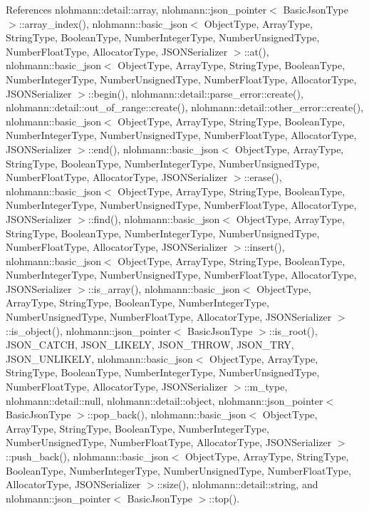 References nlohmann\+::detail\+::array, nlohmann\+::json\+\_\+pointer$<$ Basic\+Json\+Type $>$\+::array\+\_\+index(), nlohmann\+::basic\+\_\+json$<$ Object\+Type, Array\+Type, String\+Type, Boolean\+Type, Number\+Integer\+Type, Number\+Unsigned\+Type, Number\+Float\+Type, Allocator\+Type, J\+S\+O\+N\+Serializer $>$\+::at(), nlohmann\+::basic\+\_\+json$<$ Object\+Type, Array\+Type, String\+Type, Boolean\+Type, Number\+Integer\+Type, Number\+Unsigned\+Type, Number\+Float\+Type, Allocator\+Type, J\+S\+O\+N\+Serializer $>$\+::begin(), nlohmann\+::detail\+::parse\+\_\+error\+::create(), nlohmann\+::detail\+::out\+\_\+of\+\_\+range\+::create(), nlohmann\+::detail\+::other\+\_\+error\+::create(), nlohmann\+::basic\+\_\+json$<$ Object\+Type, Array\+Type, String\+Type, Boolean\+Type, Number\+Integer\+Type, Number\+Unsigned\+Type, Number\+Float\+Type, Allocator\+Type, J\+S\+O\+N\+Serializer $>$\+::end(), nlohmann\+::basic\+\_\+json$<$ Object\+Type, Array\+Type, String\+Type, Boolean\+Type, Number\+Integer\+Type, Number\+Unsigned\+Type, Number\+Float\+Type, Allocator\+Type, J\+S\+O\+N\+Serializer $>$\+::erase(), nlohmann\+::basic\+\_\+json$<$ Object\+Type, Array\+Type, String\+Type, Boolean\+Type, Number\+Integer\+Type, Number\+Unsigned\+Type, Number\+Float\+Type, Allocator\+Type, J\+S\+O\+N\+Serializer $>$\+::find(), nlohmann\+::basic\+\_\+json$<$ Object\+Type, Array\+Type, String\+Type, Boolean\+Type, Number\+Integer\+Type, Number\+Unsigned\+Type, Number\+Float\+Type, Allocator\+Type, J\+S\+O\+N\+Serializer $>$\+::insert(), nlohmann\+::basic\+\_\+json$<$ Object\+Type, Array\+Type, String\+Type, Boolean\+Type, Number\+Integer\+Type, Number\+Unsigned\+Type, Number\+Float\+Type, Allocator\+Type, J\+S\+O\+N\+Serializer $>$\+::is\+\_\+array(), nlohmann\+::basic\+\_\+json$<$ Object\+Type, Array\+Type, String\+Type, Boolean\+Type, Number\+Integer\+Type, Number\+Unsigned\+Type, Number\+Float\+Type, Allocator\+Type, J\+S\+O\+N\+Serializer $>$\+::is\+\_\+object(), nlohmann\+::json\+\_\+pointer$<$ Basic\+Json\+Type $>$\+::is\+\_\+root(), J\+S\+O\+N\+\_\+\+C\+A\+T\+CH, J\+S\+O\+N\+\_\+\+L\+I\+K\+E\+LY, J\+S\+O\+N\+\_\+\+T\+H\+R\+OW, J\+S\+O\+N\+\_\+\+T\+RY, J\+S\+O\+N\+\_\+\+U\+N\+L\+I\+K\+E\+LY, nlohmann\+::basic\+\_\+json$<$ Object\+Type, Array\+Type, String\+Type, Boolean\+Type, Number\+Integer\+Type, Number\+Unsigned\+Type, Number\+Float\+Type, Allocator\+Type, J\+S\+O\+N\+Serializer $>$\+::m\+\_\+type, nlohmann\+::detail\+::null, nlohmann\+::detail\+::object, nlohmann\+::json\+\_\+pointer$<$ Basic\+Json\+Type $>$\+::pop\+\_\+back(), nlohmann\+::basic\+\_\+json$<$ Object\+Type, Array\+Type, String\+Type, Boolean\+Type, Number\+Integer\+Type, Number\+Unsigned\+Type, Number\+Float\+Type, Allocator\+Type, J\+S\+O\+N\+Serializer $>$\+::push\+\_\+back(), nlohmann\+::basic\+\_\+json$<$ Object\+Type, Array\+Type, String\+Type, Boolean\+Type, Number\+Integer\+Type, Number\+Unsigned\+Type, Number\+Float\+Type, Allocator\+Type, J\+S\+O\+N\+Serializer $>$\+::size(), nlohmann\+::detail\+::string, and nlohmann\+::json\+\_\+pointer$<$ Basic\+Json\+Type $>$\+::top().


